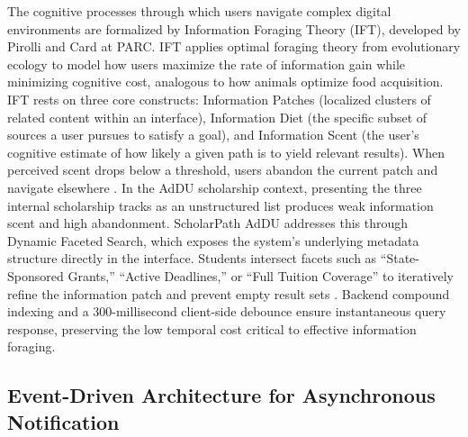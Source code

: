 The cognitive processes through which users navigate complex digital environments are formalized by Information Foraging Theory (IFT), developed by Pirolli and Card \cite{ref37} at PARC. IFT applies optimal foraging theory from evolutionary ecology to model how users maximize the rate of information gain while minimizing cognitive cost, analogous to how animals optimize food acquisition. IFT rests on three core constructs: Information Patches (localized clusters of related content within an interface), Information Diet (the specific subset of sources a user pursues to satisfy a goal), and Information Scent (the user's cognitive estimate of how likely a given path is to yield relevant results). When perceived scent drops below a threshold, users abandon the current patch and navigate elsewhere \cite{ref37}. In the AdDU scholarship context, presenting the three internal scholarship tracks as an unstructured list produces weak information scent and high abandonment. ScholarPath AdDU addresses this through Dynamic Faceted Search, which exposes the system's underlying metadata structure directly in the interface. Students intersect facets such as ``State-Sponsored Grants,'' ``Active Deadlines,'' or ``Full Tuition Coverage'' to iteratively refine the information patch and prevent empty result sets \cite{ref4,ref43}. Backend compound indexing and a 300-millisecond client-side debounce ensure instantaneous query response, preserving the low temporal cost critical to effective information foraging.

\subsection{Event-Driven Architecture for Asynchronous Notification}

